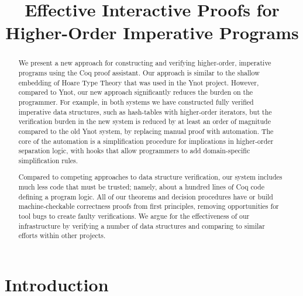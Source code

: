 \documentclass[preprint,nocopyrightspace]{sigplanconf}
\begin{document}





\title{Effective Interactive Proofs for Higher-Order Imperative Programs}


{ }

\maketitle

\begin{abstract}
  We present a new approach for constructing and verifying
  higher-order, imperative programs using the Coq proof assistant.
  Our approach is similar to the shallow embedding of Hoare Type
  Theory that was used in the Ynot project.  However, compared
  to Ynot, our new approach significantly reduces the burden on
  the programmer.  For example, in both systems we have constructed
  fully verified imperative data structures, such as hash-tables with
  higher-order iterators, but the verification burden in the new
  system is reduced by at least an order of magnitude compared to the
  old Ynot system, by replacing manual proof with automation.  The core of
  the automation is a simplification procedure for implications in
  higher-order separation logic, with hooks that allow programmers to
  add domain-specific simplification rules.
  
  Compared to competing approaches to data structure verification, our
  system includes much less code that must be trusted; namely, about a
  hundred lines of Coq code defining a program logic.  All of our
  theorems and decision procedures have or build machine-checkable
  correctness proofs from first principles, removing opportunities for
  tool bugs to create faulty verifications.  We argue for the
  effectiveness of our infrastructure by verifying a number of data
  structures and comparing to similar efforts within other projects.
\end{abstract}




\section{Introduction}
\end{document}

